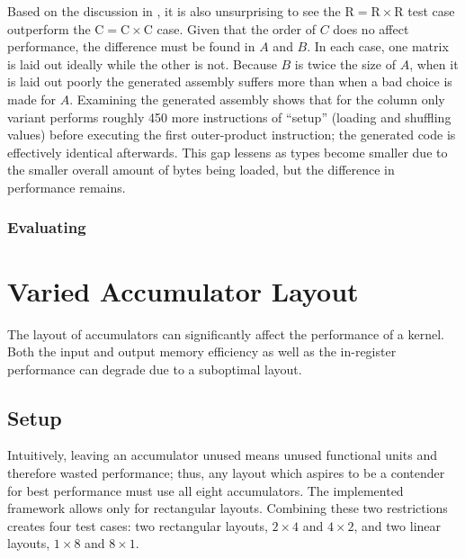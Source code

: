 \documentclass[\main/thesis.tex]{subfiles}
\begin{document}
Based on the discussion in , it is also unsurprising to see the $\textrm{R} = \textrm{R} \times \textrm{R}$ test case outperform the $\textrm{C} = \textrm{C} \times \textrm{C}$ case.
Given that the order of $C$ does no affect performance, the difference must be found in $A$ and $B$.
In each case, one matrix is laid out ideally while the other is not.
Because $B$ is twice the size of $A$, when it is laid out poorly the generated assembly suffers more than when a bad choice is made for $A$.
Examining the generated assembly shows that for  the column only variant performs roughly 450 more instructions of ``setup'' (loading and shuffling values) before executing the first outer-product instruction; the generated code is effectively identical afterwards.
This gap lessens as types become smaller due to the smaller overall amount of bytes being loaded, but the difference in performance remains.

\subsubsection{\texorpdfstring{Evaluating }{Evaluating half}}

\section{Varied Accumulator Layout}
The layout of accumulators can significantly affect the performance of a kernel.
Both the input and output memory efficiency as well as the in-register performance can degrade due to a suboptimal layout.

\subsection{Setup}
Intuitively, leaving an accumulator unused means unused functional units and therefore wasted performance; thus, any layout which aspires to be a contender for best performance must use all eight accumulators.
The implemented framework allows only for rectangular layouts.
Combining these two restrictions creates four test cases: two rectangular layouts, $2 \times 4$ and $4 \times 2$, and two linear layouts, $1 \times 8$ and $8 \times 1$.
\end{document}
